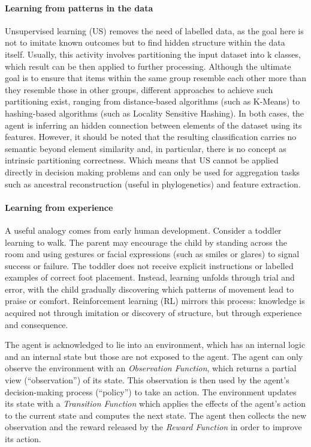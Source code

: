 \paragraph{Learning from patterns in the data}

Unsupervised learning (US) \cite{gentleman2008unsupervised} removes the need of labelled data, as the goal here is not to imitate known outcomes but to find hidden structure within the data itself.
Usually, this activity involves partitioning the input dataset into k classes, which result can be then applied to further processing.
Although the ultimate goal is to ensure that items within the same group resemble each other more than they resemble those in other groups, different approaches to achieve such partitioning exist, ranging from distance-based algorithms (such as K-Means) to hashing-based algorithms (such as Locality Sensitive Hashing).
In both cases, the agent is inferring an hidden connection between elements of the dataset using its features.
However, it should be noted that the resulting classification carries no semantic beyond element similarity and, in particular, there is no concept as intrinsic partitioning correctness. Which means that US cannot be applied directly in decision making problems and can only be used for aggregation tasks such as ancestral reconstruction (useful in phylogenetics) and feature extraction.

\paragraph{Learning from experience}

A useful analogy comes from early human development.
Consider a toddler learning to walk.
The parent may encourage the child by standing across the room and using gestures or facial expressions (such as smiles or glares) to signal success or failure.
The toddler does not receive explicit instructions or labelled examples of correct foot placement.
Instead, learning unfolds through trial and error, with the child gradually discovering which patterns of movement lead to praise or comfort.
Reinforcement learning (RL) \cite{sutton1998reinforcement} mirrors this process: knowledge is acquired not through imitation or discovery of structure, but through experience and consequence.

The agent is acknowledged to lie into an environment, which has an internal logic and an internal state but those are not exposed to the agent.
The agent can only observe the environment with an \textit{Observation Function}, which returns a partial view (``observation'') of its state.
This observation is then used by the agent's decision-making process (``policy'') to take an action.
The environment updates its state with a \textit{Transition Function} which applies the effects of the agent's action to the current state and computes the next state.
The agent then collects the new observation and the reward released by the \textit{Reward Function} in order to improve its action.


